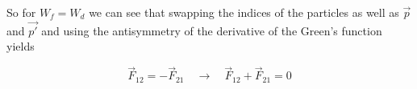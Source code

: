 So for $W_f = W_d$ we can see that swapping the indices of the particles as well as $\vec{p}$ and $\vec{p'}$ and using the antisymmetry of the derivative of the Green's function
yields

\begin{equation}
    \vec{F}_{12} = - \vec{F}_{21} \quad \rightarrow \quad \vec{F}_{12} + \vec{F}_{21} = 0
\end{equation}

\pagebreak